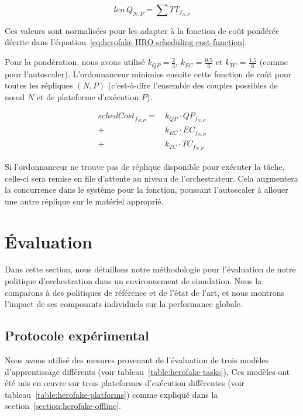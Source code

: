 \begin{equation}
    len \, Q_{N, P} = \sum TT_{f_{N, P}}
\label{eq:herofake-HRO-scheduling-platform-queue}
\end{equation}

Ces valeurs sont normalisées pour les adapter à la fonction de coût pondérée décrite dans l'équation~\ref{eq:herofake-HRO-scheduling-cost-function}.

Pour la pondération, nous avons utilisé $k_{QP} = \frac{2}{3}$, $k_{EC} = \frac{0.5}{6}$ et $k_{TC} = \frac{1.5}{6}$ (comme pour l'autoscaler). L'ordonnanceur minimise ensuite cette fonction de coût pour toutes les répliques $(N, P)$ (c'est-à-dire l'ensemble des couples possibles de nœud $N$ et de plateforme d'exécution $P$).

\begin{equation}
\begin{split}
    schedCost_{{f}_{N, P}} = \, &k_{QP} \cdot QP_{{f}_{N, P}} \\
    + &k_{EC} \cdot {EC}_{{f}_{N, P}} \\
    + &k_{TC} \cdot TC_{{f}_{N, P}}
\end{split}
\label{eq:herofake-HRO-scheduling-cost-function}
\end{equation}

Si l'ordonnanceur ne trouve pas de réplique disponible pour exécuter la tâche, celle-ci sera remise en file d'attente au niveau de l'orchestrateur. Cela augmentera la concurrence dans le système pour la fonction, poussant l'autoscaler à allouer une autre réplique sur le matériel approprié.

\section{Évaluation}
\label{section:herofake-evaluation}

Dans cette section, nous détaillons notre méthodologie pour l'évaluation de notre politique d'orchestration dans un environnement de simulation. Nous la comparons à des politiques de référence et de l'état de l'art, et nous montrons l'impact de ses composants individuels sur la performance globale.

\subsection{Protocole expérimental}

Nous avons utilisé des mesures provenant de l'évaluation de trois modèles d'apprentissage différents (voir tableau~\ref{table:herofake-tasks}). Ces modèles ont été mis en œuvre sur trois plateformes d'exécution différentes (voir tableau~\ref{table:herofake-platforms}) comme expliqué dans la section~\ref{section:herofake-offline}.

